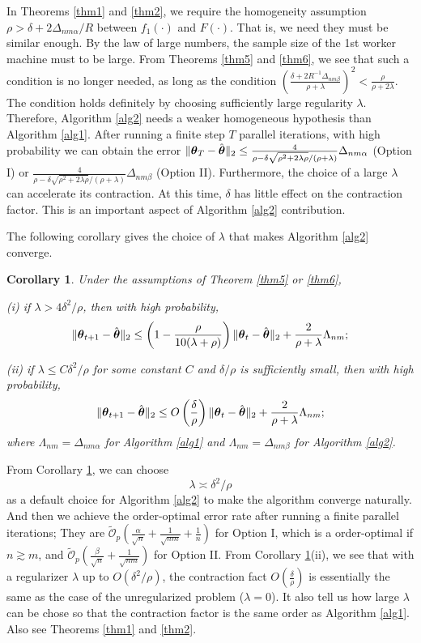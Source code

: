 \documentclass[12pt,a4paper]{article}%
\newtheorem{cor}{Corollary}[section]
\newcommand \vc[1]{{\mbox{\boldmath${#1}$}}}
\newcommand \vtheta{\vc \theta}
\numberwithin{equation}{section}
\newcommand{\sbr}[1]{\left(#1\right)}        %
\begin{document}
In Theorems \ref{thm1} and \ref{thm2}, we require the homogeneity assumption $\rho>\delta+2\Delta_{nm\alpha}/R$ between $f_1(\cdot)$ and $F(\cdot)$. That is, we need they must be similar enough. By the law of large numbers, the sample size of the 1st worker machine must to be large. From Theorems \ref{thm5} and \ref{thm6}, we see that such a condition is no longer needed, as long as the condition $\sbr{\frac{\delta+2R^{-1}\Delta_{nm\beta}}{\rho+\lambda}}^2<\frac{\rho}{\rho+2\lambda}$.  The condition holds definitely by
choosing sufficiently large regularity $\lambda$. Therefore, Algorithm \ref{alg2} needs a weaker homogeneous hypothesis than Algorithm \ref{alg1}. After running a finite step $T$ parallel iterations, with high probability we can obtain the error $\|\vtheta_T-\hat{\vtheta}\|_2\leq \frac{4}{\rho-\delta\sqrt{\rho^2+2\lambda\rho}/(\rho+\lambda)}\Delta_{nm\alpha}$ (Option I) or $\frac{4}{\rho-\delta\sqrt{\rho^2+2\lambda\rho}/(\rho+\lambda)}\Delta_{nm\beta}$ (Option II).
Furthermore, the choice of a large $\lambda$ can accelerate its contraction. At this time, $\delta$ has little effect on the contraction factor. This is an important aspect of Algorithm \ref{alg2} contribution.

The following corollary gives the choice of $\lambda$ that makes Algorithm \ref{alg2} converge.

\begin{cor}\label{cor4-1}
Under the assumptions of Theorem \ref{thm5} or \ref{thm6},

(i) if $\lambda>4\delta^2/\rho$, then with high probability,
$$\|\vtheta_{t+1}-\hat{\vtheta}\|_2
\leq \sbr{1-\frac{\rho}{10(\lambda+\rho)}}\|\vtheta_{t}-\hat{\vtheta}\|_2+\frac{2}{\rho+\lambda}\Lambda_{nm};$$

(ii) if $\lambda\leq C\delta^2/\rho$ for some constant $C$ and $\delta/\rho$ is sufficiently small, then with high probability,
$$\|\vtheta_{t+1}-\hat{\vtheta}\|_2
\leq O\sbr{\frac{\delta}{\rho}}\|\vtheta_{t}-\hat{\vtheta}\|_2+\frac{2}{\rho+\lambda}\Lambda_{nm};$$
where $\Lambda_{nm}=\Delta_{nm\alpha}$ for Algorithm \ref{alg1} and $\Lambda_{nm}=\Delta_{nm\beta}$ for Algorithm \ref{alg2}.
\end{cor}

From Corollary \ref{cor4-1}, we can choose $$\lambda\asymp \delta^2/\rho$$
as a default choice for Algorithm \ref{alg2} to make the algorithm converge naturally. And then we achieve the order-optimal error rate
after running a finite parallel iterations; They are $\tilde{\mathcal{O}}_p\sbr{\frac{\alpha}{\sqrt{n}}+\frac{1}{\sqrt{nm}}+\frac{1}{n}}$ for Option I, which is a order-optimal if $n\gtrsim m$, and $\mathcal{\tilde{O}}_p\sbr{\frac{\beta}{\sqrt{n}}+\frac{1}{\sqrt{nm}}}$ for Option II. From Corollary \ref{cor4-1}(ii), we see that with a regularizer $\lambda$ up to $O(\delta^2/\rho)$, the contraction fact $O\sbr{\frac{\delta}{\rho}}$ is essentially the same as the case of the unregularized problem ($\lambda=0$). It also tell us how large $\lambda$ can be chose so that the contraction factor is the same order as Algorithm \ref{alg1}. Also see Theorems
\ref{thm1} and \ref{thm2}.
\end{document}
